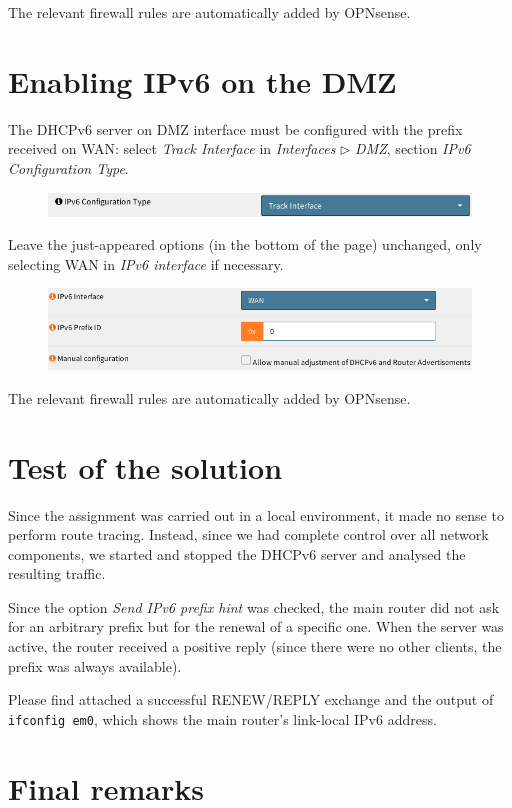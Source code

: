 \documentclass[draft]{homework}
\newcommand{\dhcp}{DHCPv6\xspace}
\newcommand{\ip}{IPv6\xspace}
\newcommand{\opn}{OPNsense\xspace}
\begin{document}
    The relevant firewall rules are automatically added by \opn.
    
    
    \section{Enabling \ip on the DMZ}
    The \dhcp server on DMZ interface must be configured with the prefix received on WAN: select \textit{Track Interface} in \textit{Interfaces} $\triangleright$ \textit{DMZ}, section \textit{\ip Configuration Type}.
    \begin{figure}[H]
        \centering
        \includegraphics[width=\linewidth]{images/dmz-ipv6}
        \label{fig:dmz-ipv6}
    \end{figure}
    \vspace{-15pt}
    
    Leave the just-appeared options (in the bottom of the page) unchanged, only selecting WAN in \textit{\ip interface} if necessary.
    \begin{figure}[H]
        \centering
        \includegraphics[width=\linewidth]{images/dmz-track}
        \label{fig:dmz-track}
    \end{figure}
    \vspace{-25pt}
    
    The relevant firewall rules are automatically added by \opn.
    
    
    \section{Test of the solution}
    Since the assignment was carried out in a local environment, it made no sense to perform route tracing.
    Instead, since we had complete control over all network components, we started and stopped the \dhcp server and analysed the resulting traffic.
    
    Since the option \textit{Send \ip prefix hint} was checked, the main router did not ask for an arbitrary prefix but for the renewal of a specific one.
    When the server was active, the router received a positive reply (since there were no other clients, the prefix was always available).
    
    Please find attached a successful RENEW/REPLY exchange and the output of \texttt{ifconfig em0}, which shows the main router's link-local \ip address.
    
    
    \section{Final remarks}
\end{document}
